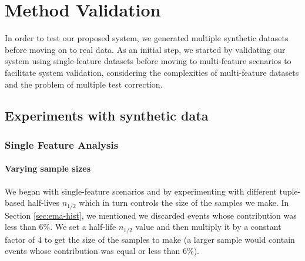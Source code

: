 \chapter{Method Validation} \label{chap:validation} \minitoc

In order to test our proposed system, we generated multiple synthetic datasets before moving on to real data. As an initial step, we started by validating our system using single-feature datasets before moving to multi-feature scenarios to facilitate system validation, considering the complexities of multi-feature datasets and the problem of multiple test correction.


\section{Experiments with synthetic data}
\subsection{Single Feature Analysis}

\subsubsection{Varying sample sizes}
We began with single-feature scenarios and by experimenting with different tuple-based half-lives $n_{1/2}$ which in turn controls the size of the samples we make. In Section \ref{sec:ema-hist}, we mentioned we discarded events whose contribution was less than 6\%. We set a half-life $n_{1/2}$ value and then multiply it by a constant factor of 4 to get the size of the samples to make (a larger sample would contain events whose contribution was equal or less than 6\%).

